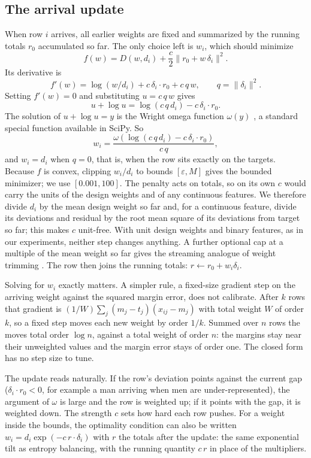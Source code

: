 \documentclass[12pt, letterpaper]{article}
\begin{document}
\subsection{The arrival update}
\label{sec:update}

When row $i$ arrives, all earlier weights are fixed and summarized by the running totals $r_0$ accumulated so far. The only choice left is $w_i$, which should minimize
\[
  f(w) = D(w, d_i) + \frac{c}{2} \lVert r_0 + w\,\delta_i \rVert^2 .
\]
Its derivative is
\[
  f'(w) = \log(w/d_i) + c\,\delta_i \cdot r_0 + c\,q\,w, \qquad q = \lVert \delta_i \rVert^2 .
\]
Setting $f'(w)=0$ and substituting $u = c\,q\,w$ gives
\[
  u + \log u = \log(c\,q\,d_i) - c\,\delta_i \cdot r_0 .
\]
The solution of $u + \log u = y$ is the Wright omega function $\omega(y)$ \citep{Corless2002}, a standard special function available in SciPy. So
\begin{equation}
  w_i = \frac{\omega\!\left(\log(c\,q\,d_i) - c\,\delta_i \cdot r_0\right)}{c\,q},
  \label{eq:update}
\end{equation}
and $w_i = d_i$ when $q = 0$, that is, when the row sits exactly on the targets. Because $f$ is convex, clipping $w_i/d_i$ to bounds $[\varepsilon, M]$ gives the bounded minimizer; we use $[0.001, 100]$. The penalty acts on totals, so on its own $c$ would carry the units of the design weights and of any continuous features. We therefore divide $d_i$ by the mean design weight so far and, for a continuous feature, divide its deviations and residual by the root mean square of its deviations from target so far; this makes $c$ unit-free. With unit design weights and binary features, as in our experiments, neither step changes anything. A further optional cap at a multiple of the mean weight so far gives the streaming analogue of weight trimming \citep{Potter1990}. The row then joins the running totals: $r \leftarrow r_0 + w_i \delta_i$.

Solving for $w_i$ exactly matters. A simpler rule, a fixed-size gradient step on the arriving weight against the squared margin error, does not calibrate. After $k$ rows that gradient is $(1/W)\sum_j (m_j - t_j)(x_{ij} - m_j)$ with total weight $W$ of order $k$, so a fixed step moves each new weight by order $1/k$. Summed over $n$ rows the moves total order $\log n$, against a total weight of order $n$: the margins stay near their unweighted values and the margin error stays of order one. The closed form has no step size to tune.

The update reads naturally. If the row's deviation points against the current gap ($\delta_i \cdot r_0 < 0$, for example a man arriving when men are under-represented), the argument of $\omega$ is large and the row is weighted up; if it points with the gap, it is weighted down. The strength $c$ sets how hard each row pushes. For a weight inside the bounds, the optimality condition can also be written $w_i = d_i \exp(-c\, r \cdot \delta_i)$ with $r$ the totals after the update: the same exponential tilt as entropy balancing, with the running quantity $c\,r$ in place of the multipliers.
\end{document}
